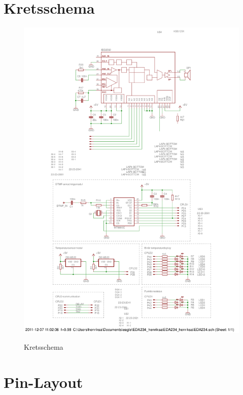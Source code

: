 \documentclass[a4paper,11pt]{article}
\begin{document}
	\section{Kretsschema}

		\begin{figure}[ht!tb]
		  \centering
		      \includegraphics[scale=0.7, angle=0]{schema.png}
			\label{fig:schema}
		  	\caption{Kretsschema}
		\end{figure}

	\section{Pin-Layout}
\end{document}
